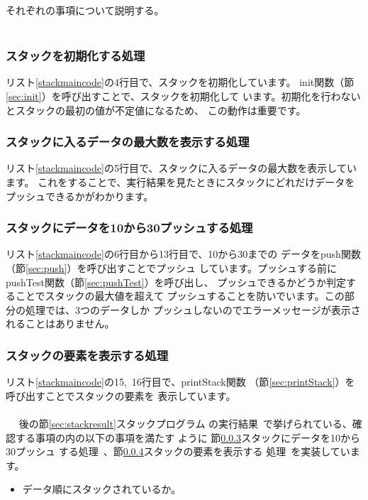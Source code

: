 \documentclass[a4j]{jarticle}
\begin{document}
それぞれの事項について説明する。
\\~~
\subsubsection{スタックを初期化する処理}
リスト\ref{stackmaincode}の4行目で、スタックを初期化しています。
init関数（節\ref{sec:init}）を呼び出すことで、スタックを初期化して
います。初期化を行わないとスタックの最初の値が不定値になるため、
この動作は重要です。
\subsubsection{スタックに入るデータの最大数を表示する処理}
リスト\ref{stackmaincode}の5行目で、スタックに入るデータの最大数を表示しています。
これをすることで、実行結果を見たときにスタックにどれだけデータを
プッシュできるかがわかります。
\subsubsection{スタックにデータを10から30プッシュする処理}
\label{sec:pushprocess1}
リスト\ref{stackmaincode}の6行目から13行目で、10から30までの
データをpush関数（節\ref{sec:push}）を呼び出すことでプッシュ
しています。プッシュする前にpushTest関数（節\ref{sec:pushTest}）を呼び出し、
プッシュできるかどうか判定することでスタックの最大値を超えて
プッシュすることを防いでいます。この部分の処理では、3つのデータしか
プッシュしないのでエラーメッセージが表示されることはありません。
\subsubsection{スタックの要素を表示する処理}
\label{sec:printStackprocess}
リスト\ref{stackmaincode}の15,~16行目で、printStack関数
（節\ref{sec:printStack}）を呼び出すことでスタックの要素を
表示しています。
\\\\~~
後の節\ref{sec:stackresult}スタックプログラム
の実行結果~で挙げられている、確認する事項の内の以下の事項を満たす
ように
節\ref{sec:pushprocess1}スタックにデータを10から30プッシュ
する処理~、節\ref{sec:printStackprocess}スタックの要素を表示する
処理~を実装しています。
\begin{itemize}
  \item データ順にスタックされているか。
\end{itemize}
~~
\end{document}
